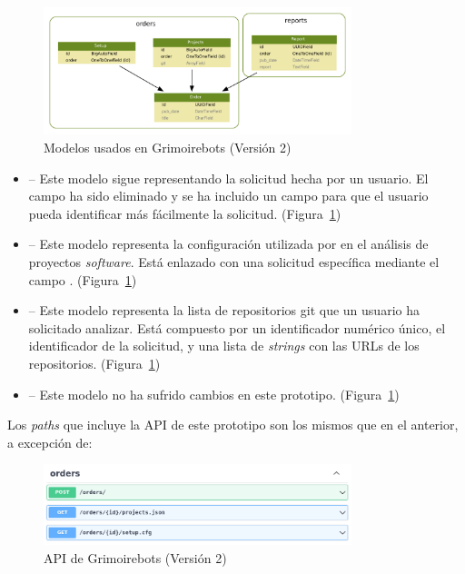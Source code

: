 \begin{figure}[ht]
    \centering
    \includegraphics[width=0.8\textwidth]{Figures/grimoirebots_ii_models}
    \decoRule
    \caption[Grimoirebots II (modelos)]{Modelos usados en Grimoirebots (Versión 2)}
    \label{fig:grimoirebots_ii_models}
\end{figure}

\begin{itemize}
    \item {} -- Este modelo sigue representando la solicitud hecha por un usuario. El campo  ha sido eliminado y se ha incluido un campo  para que el usuario pueda identificar más fácilmente la solicitud. (Figura~\ref{fig:grimoirebots_ii_models})
    \item {} -- Este modelo representa la configuración utilizada por  en el análisis de proyectos \emph{software}. Está enlazado con una solicitud específica mediante el campo . (Figura~\ref{fig:grimoirebots_ii_models})
    \item {} -- Este modelo representa la lista de repositorios git que un usuario ha solicitado analizar. Está compuesto por un identificador numérico único, el identificador de la solicitud, y una lista de \emph{strings} con las URLs de los repositorios. (Figura~\ref{fig:grimoirebots_ii_models})
    \item {} -- Este modelo no ha sufrido cambios en este prototipo. (Figura~\ref{fig:grimoirebots_ii_models})
\end{itemize}

Los \emph{paths} que incluye la API de este prototipo son los mismos que en el anterior, a excepción de:

\begin{figure}[ht]
    \centering
    \includegraphics[width=0.8\textwidth]{Figures/grimoirebots_ii_api}
    \decoRule
    \caption[Grimoirebots II (API)]{API de Grimoirebots (Versión 2)}
    \label{fig:grimoirebots_ii_api}
\end{figure}

